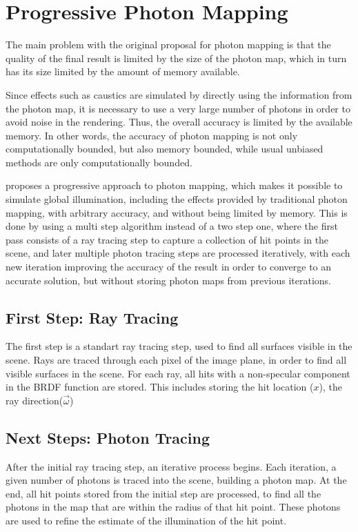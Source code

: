 \documentclass[main.tex]{subfiles}
\begin{document}
\section{Progressive Photon Mapping} \label{section:ppm}

The main problem with the original proposal for photon mapping is that the quality of the final result is limited by the size of the photon map, which in turn has its size limited by the amount of memory available.

Since effects such as caustics are simulated by directly using the information from the photon map, it is necessary to use a very large number of photons in order to avoid noise in the rendering. Thus, the overall accuracy is limited by the available memory. In other words, the accuracy of photon mapping is not only computationally bounded, but also memory bounded, while usual unbiased methods are only computationally bounded.

\cite{hachisuka2008progressive} proposes a progressive approach to photon mapping, which makes it possible to simulate global illumination, including the effects provided by traditional photon mapping, with arbitrary accuracy, and without being limited by memory. This is done by using a multi step algorithm instead of a two step one, where the first pass consists of a ray tracing step to capture a collection of hit points in the scene, and later multiple photon tracing steps are processed iteratively, with each new iteration improving the accuracy of the result in order to converge to an accurate solution, but without storing photon maps from previous iterations.

\subsection{First Step: Ray Tracing}

The first step is a standart ray tracing step, used to find all surfaces visible in the scene. Rays are traced through each pixel of the image plane, in order to find all visible surfaces in the scene. For each ray, all hits with a non-specular component in the \acs{BRDF} function are stored. This includes storing the hit location ($x$), the ray direction($\vec{\omega}$)


\subsection{Next Steps: Photon Tracing}

After the initial ray tracing step, an iterative process begins. Each iteration, a given number of photons is traced into the scene, building a photon map. At the end, all hit points stored from the initial step are processed, to find all the photons in the map that are within the radius of that hit point. These photons are used to refine the estimate of the illumination of the hit point.
\end{document}
